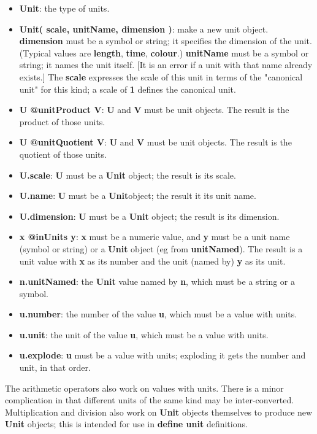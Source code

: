 \documentclass{report}
\begin{document}
\begin{itemize}\item {\bf Unit}: the type of units.

\item {\bf Unit( scale, unitName, dimension )}: make a new unit object. {\bf dimension} must
be a symbol or string; it specifies the dimension of the unit. (Typical values
are {\bf length}, {\bf time}, {\bf colour}.) {\bf unitName} must be a symbol or string; it
names the unit itself. {[}It is an error if a unit with that name already
exists.{]} The {\bf scale} expresses the scale of this unit in terms of the
"canonical unit" for this kind; a scale of {\bf 1} defines the canonical unit.

\item {\bf U @unitProduct V}: {\bf U} and {\bf V} must be unit objects. The result is the
product of those units.

\item {\bf U @unitQuotient V}: {\bf U} and {\bf V} must be unit objects. The result is the
quotient of those units.

\item {\bf U.scale}: {\bf U} must be a {\bf Unit} object; the result is its scale.

\item {\bf U.name}: {\bf U} must be a {\bf Unit}object; the result it its unit name.

\item {\bf U.dimension}: {\bf U} must be a {\bf Unit} object; the result is its dimension.

\item {\bf x @inUnits y}: {\bf x} must be a numeric value, and {\bf y} must be a unit name
(symbol or string) or a {\bf Unit} object (eg from {\bf unitNamed}). The result is a
unit value with {\bf x} as its number and the unit (named by) {\bf y} as its unit.

\item {\bf n.unitNamed}: the {\bf Unit} value named by {\bf n}, which must be a string or a
symbol.

\item {\bf u.number}: the number of the value {\bf u}, which must be a value with
units.

\item {\bf u.unit}: the unit of the value {\bf u}, which must be a value with units.

\item {\bf u.explode}: {\bf u} must be a value with units; exploding it gets the number
and unit, in that order.

\end{itemize}The arithmetic operators also work on values with units. There is a minor
complication in that different units of the same kind may be inter-converted.
Multiplication and division also work on {\bf Unit} objects themselves to produce
new {\bf Unit} objects; this is intended for use in {\bf define unit} definitions.
\end{document}
